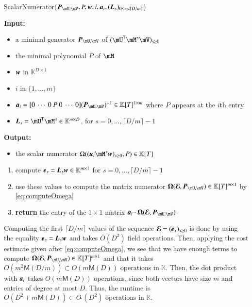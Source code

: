 \documentclass[final,1p,times,authoryear]{elsarticle}
\newcommand{\mat}[1]{\bm{\MakeUppercase{#1}}} %
\newcommand{\row}[1]{\bm{\MakeLowercase{#1}}} %
\newcommand{\col}[1]{\bm{\MakeLowercase{#1}}} %
\newcommand{\softO}[1]{O{\tilde{~}}(#1)} %
\newcommand{\minpoly}{P}
\newcommand{\trsp}[1]{#1^{\mathsf{T}}} %
\def\M {\ensuremath{\mathsf{M}}}
\def\K{\mathbb{K}}
\def\K {\ensuremath{\mathbb{K}}}
\newcommand{\mUt}{\trsp{\mU}}
\begin{document}
\begin{algorithm}[ht]
  \caption{{\sf ScalarNumerator}($\mat{P}_{\mU,\mV}, \minpoly, \row{w}, i, \row{a}_i,(\mat{L}_s)_{0 \le s < \lceil D/m\rceil}$)}
  {\bf Input:} \vspace{-0.5em}
  \begin{itemize}
    \item a minimal generator $\mat{P}_{\mU,\mV}$ of $(\mUt \mM^s \mV)_{s \ge 0}$
    \item the minimal polynomial $P$ of $\mM$
    \item $\row{w}$ in $\K^{D \times 1}$
    \item $i$ in $\{1,\dots,m\}$
    \item $\row{a}_i =  [0~\cdots~0~\minpoly~0~\cdots~0]  (\mat{P}_{\mU,\mV})^{-1} \in \K[T]^{1\times m}$
      where $\minpoly$ appears at the $i$th entry
    \item $\mat{L}_s = \mUt \mM^s \in \K^{m\times D}$, for $s=0,\dots,\lceil D/m\rceil-1$
  \end{itemize}
  {\bf Output:}  \vspace{-0.5em}
  \begin{itemize}
    \item         the scalar numerator $\Omega((\row{u}_i \mM^s \col{w})_{s \ge 0}, \minpoly) \in \K[T]$
  \end{itemize}
  \begin{enumerate}
    \item compute $\col{E}_s = \mat{L}_s \col{w} \in \K^{m \times 1}$ for $s=0,\dots,\lceil D/m\rceil-1$
    \item use these values to compute the matrix numerator $ \mat{\Omega}(\mat{\mathcal{E}}, \mat{P}_{\mU,\mV}) \in \K[T]^{m \times 1}$ 
      by \cref{eq:computeOmega}
    \item {\bf return} the entry of the $1 \times 1$ matrix $\row{a}_i\cdot  \mat{\Omega}(\mat{\mathcal{E}}, \mat{P}_{\mU,\mV})$ 
  \end{enumerate}
  \label{algo:scalar_numerator}
\end{algorithm}

Computing the first $\lceil D/m \rceil$ values of the sequence
$\mat{\mathcal{E}}=(\col{e}_s)_{s \ge 0}$ is done by using the
equality $\col{E}_s = \mat{L}_s \col{w}$ and takes $O(D^2)$ field
operations. Then, applying the cost estimate given after
\cref{eq:computeOmega}, we see that we have enough terms to compute
$\mat{\Omega}(\mat{\mathcal{E}}, \mat{P}_{\mU,\mV}) \in \K[T]^{m
\times 1}$ and that it takes $O(m^2 \M(D/m)) \subset O(m \M(D))$ operations in
$\K$. Then, the dot product with $\row{a}_i$ takes $O(m \M(D))$
operations, since both vectors have size $m$ and entries of degree at
most $D$. Thus, the runtime is 
\(O(D^2 + m \M(D)) \subset \softO{D^2}\)
operations in $\K$.
\end{document}
